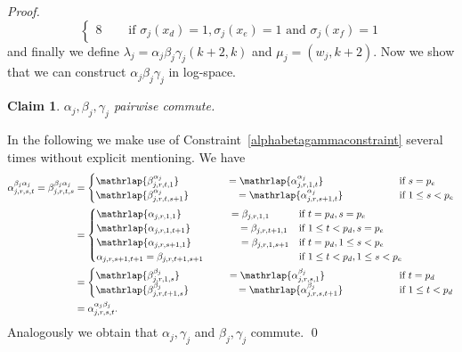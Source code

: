 \documentclass{article}
\newtheorem{claim}{Claim}
\begin{document}
\begin{proof}
\begin{displaymath}
\begin{cases}
8 & \text{~~~~if } \sigma_j(x_d)=1, \sigma_j(x_e)=1 \text{ and } \sigma_j(x_f)=1
\end{cases}
\end{displaymath}
and finally we define $\lambda_j = \alpha_j\beta_j\gamma_j(k+2,k)$ and $\mu_j = (w_j,k+2)$. Now we show that we can construct $\alpha_j\beta_j\gamma_j$ in log-space.
\begin{claim}\label{claimjalphabetagammecommute}
$\alpha_j, \beta_j, \gamma_j$ pairwise commute.
\end{claim}
In the following we make use of Constraint~\eqref{alphabetagammaconstraint} several times without explicit mentioning. We have
\begin{align*}
\alpha_{j,r,s,t}^{\beta_j\alpha_j}=\beta_{j,r,t,s}^{\beta_j\alpha_j}&= \begin{cases}
\mathrlap{\beta_{j,r,t,1}^{\alpha_j}}\hphantom{\alpha_{j,r,s+1,t+1}} = \mathrlap{\alpha_{j,r,1,t}^{\alpha_j}}\hphantom{\beta_{j,r,t+1,s+1}} & \text{if } s=p_e\\
\mathrlap{\beta_{j,r,t,s+1}^{\alpha_j}}\hphantom{\alpha_{j,r,s+1,t+1}} = \mathrlap{\alpha_{j,r,s+1,t}^{\alpha_j}}\hphantom{\beta_{j,r,t+1,s+1}} & \text{if } 1 \leq s < p_e
\end{cases}\\
&= \begin{cases}
\mathrlap{\alpha_{j,r,1,1}}\hphantom{\alpha_{j,r,s+1,t+1}} = \beta_{j,r,1,1} & \text{if } t=p_d, s=p_e\\
\mathrlap{\alpha_{j,r,1,t+1}}\hphantom{\alpha_{j,r,s+1,t+1}} = \beta_{j,r,t+1,1} & \text{if } 1 \leq t < p_d, s=p_e\\
\mathrlap{\alpha_{j,r,s+1,1}}\hphantom{\alpha_{j,r,s+1,t+1}} = \beta_{j,r,1,s+1} & \text{if } t=p_d, 1 \leq s < p_e\\
\alpha_{j,r,s+1,t+1} = \beta_{j,r,t+1,s+1} & \text{if } 1 \leq t < p_d, 1 \leq s < p_e
\end{cases}\\
&=\begin{cases}
\mathrlap{\beta_{j,r,1,s}^{\beta_j}}\hphantom{\alpha_{j,r,s+1,t+1}} = \mathrlap{\alpha_{j,r,s,1}^{\beta_j}}\hphantom{\beta_{j,r,t+1,s+1}} & \text{if } t=p_d\\
\mathrlap{\beta_{j,r,t+1,s}^{\beta_j}}\hphantom{\alpha_{j,r,s+1,t+1}} = \mathrlap{\alpha_{j,r,s,t+1}^{\beta_j}}\hphantom{\beta_{j,r,t+1,s+1}} & \text{if } 1 \leq t < p_d
\end{cases}\\
&=\alpha_{j,r,s,t}^{\alpha_j\beta_j}.
\end{align*}
Analogously we obtain that $\alpha_j,\gamma_j$ and $\beta_j,\gamma_j$ commute.
\qed


\end{proof}
\end{document}
